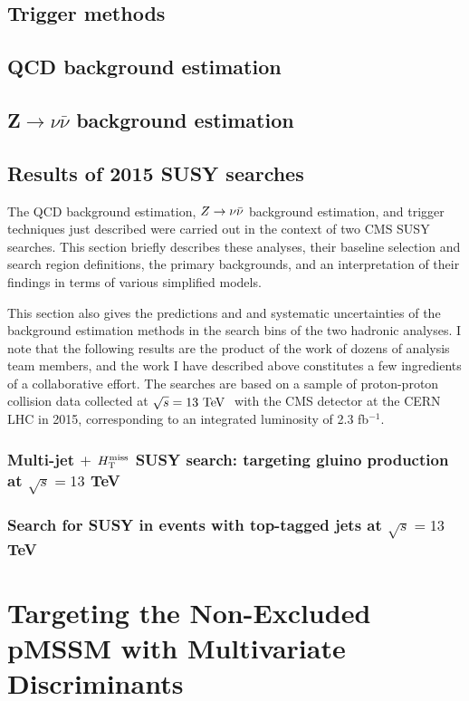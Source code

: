 \section{Trigger methods}
\label{sec:anatrig}


\section{QCD background estimation}
\label{sec:qcd}


\section{Z$\rightarrow\nu\bar{\nu}$ background estimation}
\label{sec:zinv}




\section{Results of 2015 SUSY searches}
\label{sec:2015results}
The QCD background estimation, $Z\rightarrow \nu\bar{\nu}$ background estimation, and trigger techniques just described were carried out in the context of two CMS SUSY searches. This section briefly describes these analyses, their baseline selection and search region definitions, the primary backgrounds, and an interpretation of their findings in terms of various simplified models. 

This section also gives the predictions and and systematic uncertainties of the background estimation methods in the search bins of the two hadronic analyses. I note that the following results are the product of the work of dozens of analysis team members, and the work I have described above constitutes a few ingredients of a collaborative effort. The searches are based on a sample of proton-proton collision data collected at $\sqrt{s}=13~\text{TeV}~$ with the CMS detector at the CERN LHC in 2015, corresponding to an integrated luminosity of 2.3 fb$^{-1}$.

\subsection{Multi-jet $+$ $H_{\text{T}}^{\rm miss}$ SUSY search: targeting gluino production at $\sqrt{s}=13$ TeV}
\label{sec:ra2b2015}

\FloatBarrier

\subsection{Search for SUSY in events with top-tagged jets at $\sqrt{s}=13$ TeV}
\label{sec:hadstop2015}

\FloatBarrier

\chapter{Targeting the Non-Excluded pMSSM with Multivariate Discriminants}
\label{chap:money}
\FloatBarrier
